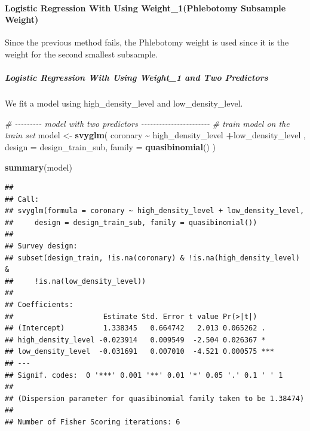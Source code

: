 \documentclass[
]{article}
\newenvironment{Shaded}{\begin{snugshade}}{\end{snugshade}}
\newcommand{\AttributeTok}[1]{\textcolor[rgb]{0.13,0.29,0.53}{#1}}
\newcommand{\CommentTok}[1]{\textcolor[rgb]{0.56,0.35,0.01}{\textit{#1}}}
\newcommand{\FunctionTok}[1]{\textcolor[rgb]{0.13,0.29,0.53}{\textbf{#1}}}
\newcommand{\NormalTok}[1]{#1}
\newcommand{\OtherTok}[1]{\textcolor[rgb]{0.56,0.35,0.01}{#1}}
\newcommand{\SpecialCharTok}[1]{\textcolor[rgb]{0.81,0.36,0.00}{\textbf{#1}}}
\begin{document}
\paragraph{Logistic Regression With Using Weight\_1(Phlebotomy Subsample
Weight)}\label{logistic-regression-with-using-weight_1phlebotomy-subsample-weight}

Since the previous method fails, the Phlebotomy weight is used since it
is the weight for the second smallest subsample.

\subparagraph{Logistic Regression With Using Weight\_1 and Two
Predictors}\label{logistic-regression-with-using-weight_1-and-two-predictors}

We fit a model using high\_density\_level and low\_density\_level.

\begin{Shaded}
\begin{Highlighting}[]
\CommentTok{\# {-}{-}{-}{-}{-}{-}{-}{-}{-} model with two predictors {-}{-}{-}{-}{-}{-}{-}{-}{-}{-}{-}{-}{-}{-}{-}{-}{-}{-}{-}{-}{-}{-}{-}}
\CommentTok{\# train model on the train set}
\NormalTok{model }\OtherTok{\textless{}{-}} \FunctionTok{svyglm}\NormalTok{(}
\NormalTok{  coronary }\SpecialCharTok{\textasciitilde{}}\NormalTok{ high\_density\_level }\SpecialCharTok{+}\NormalTok{low\_density\_level ,}
  \AttributeTok{design =}\NormalTok{ design\_train\_sub,}
  \AttributeTok{family =} \FunctionTok{quasibinomial}\NormalTok{()}
\NormalTok{)}

\FunctionTok{summary}\NormalTok{(model)}
\end{Highlighting}
\end{Shaded}

\begin{verbatim}
## 
## Call:
## svyglm(formula = coronary ~ high_density_level + low_density_level, 
##     design = design_train_sub, family = quasibinomial())
## 
## Survey design:
## subset(design_train, !is.na(coronary) & !is.na(high_density_level) & 
##     !is.na(low_density_level))
## 
## Coefficients:
##                     Estimate Std. Error t value Pr(>|t|)    
## (Intercept)         1.338345   0.664742   2.013 0.065262 .  
## high_density_level -0.023914   0.009549  -2.504 0.026367 *  
## low_density_level  -0.031691   0.007010  -4.521 0.000575 ***
## ---
## Signif. codes:  0 '***' 0.001 '**' 0.01 '*' 0.05 '.' 0.1 ' ' 1
## 
## (Dispersion parameter for quasibinomial family taken to be 1.38474)
## 
## Number of Fisher Scoring iterations: 6
\end{verbatim}
\end{document}
